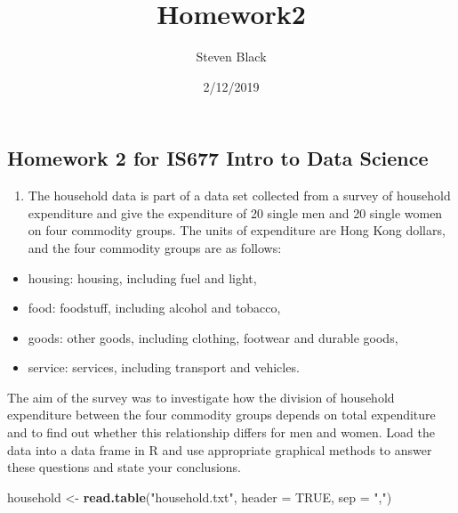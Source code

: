 \documentclass[]{article}
\title{Homework2}
\author{Steven Black}
\date{2/12/2019}
\newenvironment{Shaded}{\begin{snugshade}}{\end{snugshade}}
\newcommand{\KeywordTok}[1]{\textcolor[rgb]{0.13,0.29,0.53}{\textbf{#1}}}
\newcommand{\DataTypeTok}[1]{\textcolor[rgb]{0.13,0.29,0.53}{#1}}
\newcommand{\StringTok}[1]{\textcolor[rgb]{0.31,0.60,0.02}{#1}}
\newcommand{\OtherTok}[1]{\textcolor[rgb]{0.56,0.35,0.01}{#1}}
\newcommand{\NormalTok}[1]{#1}
\providecommand{\tightlist}{%
  \setlength{\itemsep}{0pt}\setlength{\parskip}{0pt}}
\begin{document}
\maketitle

\subsection{Homework 2 for IS677 Intro to Data
Science}\label{homework-2-for-is677-intro-to-data-science}

\begin{enumerate}
\def\labelenumi{\arabic{enumi}.}
\tightlist
\item
  The household data is part of a data set collected from a survey of
  household expenditure and give the expenditure of 20 single men and 20
  single women on four commodity groups. The units of expenditure are
  Hong Kong dollars, and the four commodity groups are as follows:
\end{enumerate}

\begin{itemize}
\tightlist
\item
  housing: housing, including fuel and light,
\item
  food: foodstuff, including alcohol and tobacco,
\item
  goods: other goods, including clothing, footwear and durable goods,
\item
  service: services, including transport and vehicles.
\end{itemize}

The aim of the survey was to investigate how the division of household
expenditure between the four commodity groups depends on total
expenditure and to find out whether this relationship differs for men
and women. Load the data into a data frame in R and use appropriate
graphical methods to answer these questions and state your conclusions.

\begin{Shaded}
\begin{Highlighting}[]
\NormalTok{household <-}\StringTok{ }\KeywordTok{read.table}\NormalTok{(}\StringTok{"household.txt"}\NormalTok{, }\DataTypeTok{header =} \OtherTok{TRUE}\NormalTok{, }\DataTypeTok{sep =} \StringTok{","}\NormalTok{)}
\end{Highlighting}
\end{Shaded}
\end{document}
